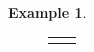 \documentclass[preprint,12pt]{elsarticle}
\theoremstyle{definition}
\newtheorem{example}[thm]{Example}
\theoremstyle{remark}
\begin{document}
\begin{example}
\begin{figure}[h]
\begin{tabular}{cc}
\begin{minipage}[b]{.47\textwidth}



\end{minipage}
\end{tabular}
\end{figure}
\end{example}
\end{document}
